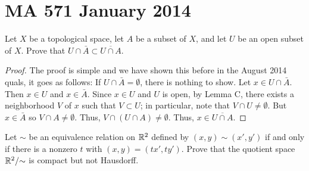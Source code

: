 \chapter{MA 571 January 2014}
\begin{problem}
Let $X$ be a topological space, let $A$ be a subset of $X$, and let $U$ be
an open subset of $X$. Prove that $U\cap\bar A\subset\overline{U\cap A}$.
\end{problem}
\begin{proof}
The proof is simple and we have shown this before in the August 2014
quals, it goes as follows: If $U\cap\bar A=\emptyset$, there is nothing to
show. Let $x\in U\cap\bar A$. Then $x\in U$ and $x\in\bar A$. Since $x\in
U$ and $U$ is open, by Lemma C, there exists a neighborhood $V$ of $x$ such
that $V\subset U$; in particular, note that $V\cap U\neq\emptyset$. But
$x\in\bar A$ so $V\cap A\neq\emptyset$. Thus, $V\cap(U\cap
A)\neq\emptyset$. Thus, $x\in\overline{U\cap A}$.
\end{proof}
\begin{problem}
Let $\sim$ be an equivalence relation on $\mathbb{R}^2$ defined by
$(x,y)\sim(x',y')$ if and only if there is a nonzero $t$ with
$(x,y)=(tx',ty')$. Prove that the quotient space $\mathbb{R}^2/{\sim}$ is compact
but not Hausdorff.
\end{problem}
